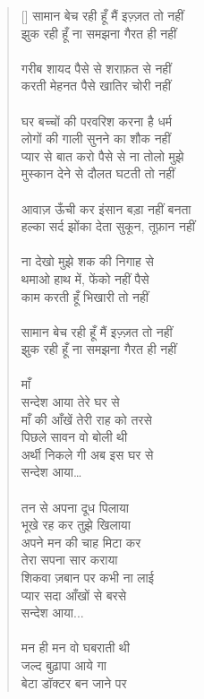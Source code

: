 \begin{verse}[\versewidth]\texthindi{
सामान बेच रही हूँ मैं इज़्ज़त तो नहीं\\
झुक रही हूँ ना समझना गैरत ही नहीं\\
\\
गरीब शायद पैसे से शराफ़त से नहीं\\
करती मेहनत पैसे खातिर चोरी नहीं\\
\\
घर बच्चों की परवरिश करना है धर्म\\
लोगों की गाली सुनने का शौक नहीं\\
प्यार से बात करो पैसे से ना तोलो मुझे\\
मुस्कान देने से दौलत घटती तो नहीं\\
\\
आवाज़ ऊँची कर इंसान बड़ा नहीं बनता\\
हल्का सर्द झोंका देता सुकून, तूफ़ान नहीं\\
\\
ना देखो मुझे शक की निगाह से\\
थमाओ हाथ में, फेंको नहीं पैसे\\
काम करती हूँ भिखारी तो नहीं\\
\\
सामान बेच रही हूँ मैं इज़्ज़त तो नहीं\\
झुक रही हूँ ना समझना गैरत ही नहीं\\
\\
माँ\\
सन्देश आया तेरे घर से\\
माँ की आँखें तेरी राह को तरसे\\
पिछले सावन वो बोली थी\\
अर्थी निकले गी अब इस घर से\\
सन्देश आया…\\
\\
तन से अपना दूध पिलाया\\
भूखे रह कर तुझे खिलाया\\
अपने मन की चाह मिटा कर\\
तेरा सपना सार कराया\\
शिकवा ज़बान पर कभी ना लाई\\
प्यार सदा आँखों से बरसे\\
सन्देश आया...\\
\\
मन ही मन वो घबराती थी\\
जल्द बुढ़ापा आये गा\\
बेटा डॉक्टर बन जाने पर\\
}
\end{verse}
